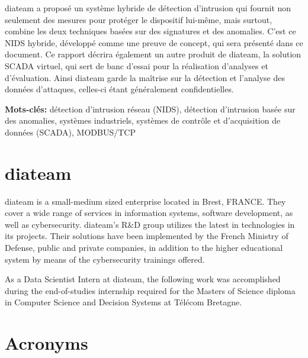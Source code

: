 \documentclass[11pt,a4paper]{article}
\begin{document}
diateam a proposé un système hybride de détection d'intrusion qui
fournit non seulement des mesures pour protéger le dispositif lui-même,
mais surtout, combine les deux techniques basées sur des signatures et
des anomalies. C'est ce NIDS hybride, développé comme une preuve de
concept, qui sera présenté dans ce document. Ce rapport décrira
également un autre produit de diateam, la solution SCADA virtuel, qui
sert de banc d'essai pour la réalisation d'analyses et d'évaluation.
Ainsi diateam garde la maîtrise sur la détection et l'analyse des
données d'attaques, celles-ci étant généralement confidentielles.

\bigskip
\bigskip
\textbf{Mots-clés: } détection d'intrusion réseau (NIDS), détection
d'intrusion basée sur des anomalies, systèmes industriels, systèmes de
contrôle et d'acquisition de données (SCADA), MODBUS/TCP

\newpage
\mbox{} \thispagestyle{empty}

\clearpage

\section*{diateam}\label{diateam}

diateam is a small-medium sized enterprise located in Brest, FRANCE.
They cover a wide range of services in information systems, software
development, as well as cybersecurity. diateam's R\&D group utilizes the
latest in technologies in its projects. Their solutions have been
implemented by the French Ministry of Defense, public and private
companies, in addition to the higher educational system by means of the
cybersecurity trainings offered.

As a Data Scientist Intern at diateam, the following work was
accomplished during the end-of-studies internship required for the
Masters of Science diploma in Computer Science and Decision Systems at
Télécom Bretagne.

\newpage
\mbox{} \thispagestyle{empty}

\clearpage

\tableofcontents

\cleardoublepage

\listoffigures

\cleardoublepage

\listoftables

\newpage

\section*{Acronyms}\label{acronyms}
\end{document}
